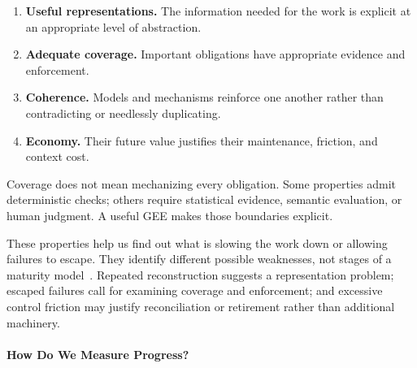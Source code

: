 \begin{enumerate}
\tightlist
\item \textbf{Useful representations.} The information needed for the work is explicit at an appropriate level of abstraction.
\item \textbf{Adequate coverage.} Important obligations have appropriate evidence and enforcement.
\item \textbf{Coherence.} Models and mechanisms reinforce one another rather than contradicting or needlessly duplicating.
\item \textbf{Economy.} Their future value justifies their maintenance, friction, and context cost.
\end{enumerate}

Coverage does not mean mechanizing every obligation. Some properties admit deterministic checks; others require statistical evidence, semantic evaluation, or human judgment. A useful GEE makes those boundaries explicit.


These properties help us find out what is slowing the work down or allowing failures to escape. They identify different possible weaknesses, not stages of a maturity model~\citep{bollinger1991critical}. Repeated reconstruction suggests a representation problem; escaped failures call for examining coverage and enforcement; and excessive control friction may justify reconciliation or retirement rather than additional machinery.


\paragraph{How Do We Measure Progress?}


